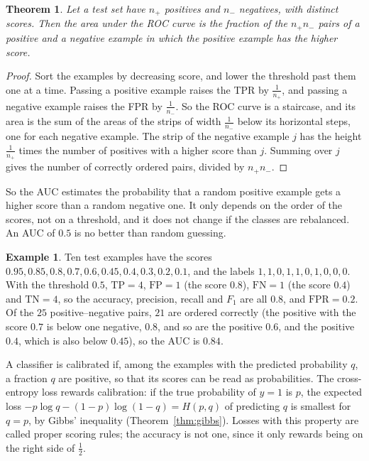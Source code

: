 \documentclass[11pt]{article}
\theoremstyle{definition}
\newtheorem{example}[definition]{Example}
\theoremstyle{plain}
\newtheorem{theorem}[definition]{Theorem}
\theoremstyle{remark}
\begin{document}
\begin{theorem}\label{thm:auc}
    Let a test set have $n_+$ positives and $n_-$ negatives, with distinct scores. Then the area under the ROC curve is the fraction of the $n_+n_-$ pairs of a positive and a negative example in which the positive example has the higher score.
\end{theorem}

\begin{proof}
    Sort the examples by decreasing score, and lower the threshold past them one at a time. Passing a positive example raises the TPR by $\frac{1}{n_+}$, and passing a negative example raises the FPR by $\frac{1}{n_-}$. So the ROC curve is a staircase, and its area is the sum of the areas of the strips of width $\frac{1}{n_-}$ below its horizontal steps, one for each negative example. The strip of the negative example $j$ has the height $\frac{1}{n_+}$ times the number of positives with a higher score than $j$. Summing over $j$ gives the number of correctly ordered pairs, divided by $n_+n_-$.
\end{proof}

So the AUC estimates the probability that a random positive example gets a higher score than a random negative one. It only depends on the order of the scores, not on a threshold, and it does not change if the classes are rebalanced. An AUC of $0.5$ is no better than random guessing.

\begin{example}\label{ex:metrics}
    Ten test examples have the scores $0.95, 0.85, 0.8, 0.7, 0.6, 0.45, 0.4, 0.3, 0.2, 0.1$, and the labels $1, 1, 0, 1, 1, 0, 1, 0, 0, 0$. With the threshold $0.5$, $\mathrm{TP} = 4$, $\mathrm{FP} = 1$ (the score $0.8$), $\mathrm{FN} = 1$ (the score $0.4$) and $\mathrm{TN} = 4$, so the accuracy, precision, recall and $F_1$ are all $0.8$, and $\mathrm{FPR} = 0.2$. Of the $25$ positive--negative pairs, $21$ are ordered correctly (the positive with the score $0.7$ is below one negative, $0.8$, and so are the positive $0.6$, and the positive $0.4$, which is also below $0.45$), so the AUC is $0.84$.
\end{example}

A classifier is calibrated if, among the examples with the predicted probability $q$, a fraction $q$ are positive, so that its scores can be read as probabilities. The cross-entropy loss rewards calibration: if the true probability of $y = 1$ is $p$, the expected loss $-p\log q - (1 - p)\log(1 - q) = H(p, q)$ of predicting $q$ is smallest for $q = p$, by Gibbs' inequality (Theorem~\ref{thm:gibbs}). Losses with this property are called proper scoring rules; the accuracy is not one, since it only rewards being on the right side of $\frac{1}{2}$.
\end{document}
